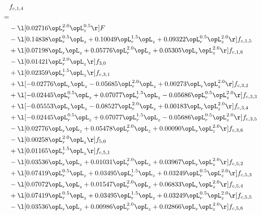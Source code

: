 \begin{alignat}{2} 
\label{eq:f_14_2} 
& f_{c,1,4} \nonumber \\ 
 = \\ 
& - \l[  0.02716 \opL_r^{2.0} \opL_z^{0.5}  \r] F \nonumber \\ 
& - \l[  0.14838 \opL_r^{0.5} \opL_z +  0.10049 \opL_r^{1.5} \opL_z +  0.09322 \opL_r^{0.5} \opL_z^{2.0}  \r] f_{c,1,5} \nonumber \\ 
& + \l[  0.07198 \opL_r \opL_z +  0.05776 \opL_r^{2.0} \opL_z +  0.05305 \opL_r \opL_z^{2.0}  \r] f_{c,1,6} \nonumber \\ 
& - \l[  0.01421 \opL_r^{2.0} \opL_z  \r] f_{3,0} \nonumber \\ 
& + \l[  0.02359 \opL_r^{1.5} \opL_z  \r] f_{c,3,1} \nonumber \\ 
& + \l[  -0.02776 \opL_r \opL_z   -0.05685 \opL_r^{2.0} \opL_z +  0.00273 \opL_r \opL_z^{2.0}  \r] f_{c,3,2} \nonumber \\ 
& + \l[  -0.02445 \opL_r^{0.5} \opL_z +  0.07077 \opL_r^{1.5} \opL_z   -0.05686 \opL_r^{0.5} \opL_z^{2.0}  \r] f_{c,3,3} \nonumber \\ 
& + \l[  -0.05553 \opL_r \opL_z   -0.08527 \opL_r^{2.0} \opL_z +  0.00183 \opL_r \opL_z^{2.0}  \r] f_{c,3,4} \nonumber \\ 
& + \l[  -0.02445 \opL_r^{0.5} \opL_z +  0.07077 \opL_r^{1.5} \opL_z   -0.05686 \opL_r^{0.5} \opL_z^{2.0}  \r] f_{c,3,5} \nonumber \\ 
& - \l[  0.02776 \opL_r \opL_z +  0.05478 \opL_r^{2.0} \opL_z +  0.00090 \opL_r \opL_z^{2.0}  \r] f_{c,3,6} \nonumber \\ 
& - \l[  0.00258 \opL_r^{2.0} \opL_z  \r] f_{5,0} \nonumber \\ 
& + \l[  0.01165 \opL_r^{1.5} \opL_z  \r] f_{c,5,1} \nonumber \\ 
& - \l[  0.03536 \opL_r \opL_z +  0.01031 \opL_r^{2.0} \opL_z +  0.03967 \opL_r \opL_z^{2.0}  \r] f_{c,5,2} \nonumber \\ 
& + \l[  0.07419 \opL_r^{0.5} \opL_z +  0.03495 \opL_r^{1.5} \opL_z +  0.03249 \opL_r^{0.5} \opL_z^{2.0}  \r] f_{c,5,3} \nonumber \\ 
& - \l[  0.07072 \opL_r \opL_z +  0.01547 \opL_r^{2.0} \opL_z +  0.06833 \opL_r \opL_z^{2.0}  \r] f_{c,5,4} \nonumber \\ 
& + \l[  0.07419 \opL_r^{0.5} \opL_z +  0.03495 \opL_r^{1.5} \opL_z +  0.03249 \opL_r^{0.5} \opL_z^{2.0}  \r] f_{c,5,5} \nonumber \\ 
& - \l[  0.03536 \opL_r \opL_z +  0.00986 \opL_r^{2.0} \opL_z +  0.02866 \opL_r \opL_z^{2.0}  \r] f_{c,5,6} \nonumber \\ 

\end{alignat}
